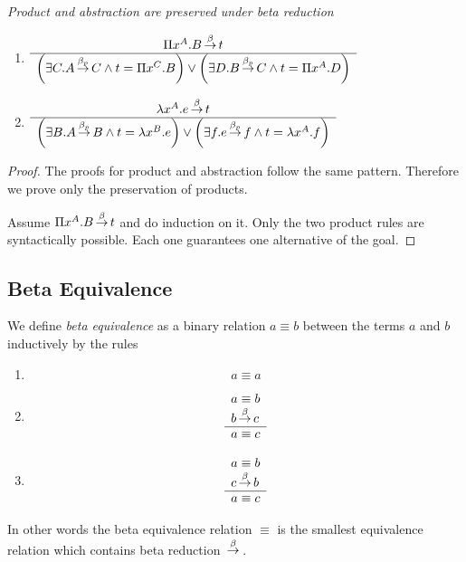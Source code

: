 \begin{lemma}
    \label{ReductionProductAbstraction}
    \emph{Product and abstraction are preserved under beta reduction}
    \begin{enumerate}
    \item
    $
        \begin{array}{c} 
            \Pi x^A.B {\,\stackrel{\beta}{\to}\,} t
         \\ \hline 
            \left( \exists C. A {\,\stackrel{\beta_p}{\to}\,} C \land t = \Pi x^C. B \right)
            \lor
            \left( \exists D. B {\,\stackrel{\beta_p}{\to}\,} C \land t = \Pi x^A. D \right)
        \end{array}
    $
    \item
    $
        \begin{array}{c} 
            \lambda x^A.e {\,\stackrel{\beta}{\to}\,} t
         \\ \hline 
            \left( \exists B. A {\,\stackrel{\beta_p}{\to}\,} B \land t = \lambda x^B. e \right)
            \lor
            \left( \exists f. e {\,\stackrel{\beta_p}{\to}\,} f \land t = \lambda x^A. f \right)
        \end{array}
    $
    \end{enumerate}

    \begin{proof}
        The proofs for product and abstraction follow the same pattern.
        Therefore we prove only the preservation of products.

        Assume $\Pi x^A. B {\,\stackrel{\beta}{\to}\,} t$ and do induction on it. Only the two
        product rules are syntactically possible. Each one guarantees one
        alternative of the goal.
    \end{proof}
\end{lemma}



\subsection{Beta Equivalence}


\begin{definition}
    We define \emph{beta equivalence} as a binary relation $a \equiv b$ between
    the terms $a$ and $b$ inductively by the rules
    \begin{enumerate}
    \item
        $$ a \equiv a$$

    \item
        $$
        \begin{array}{l} 
            a \equiv b
            \\
            b {\,\stackrel{\beta}{\to}\,} c
         \\ \hline 
            a \equiv c
        \end{array}
        $$

    \item
        $$
        \begin{array}{l} 
            a \equiv b
            \\
            c {\,\stackrel{\beta}{\to}\,} b
         \\ \hline 
            a \equiv c
        \end{array}
        $$
    \end{enumerate}

    In other words the beta equivalence relation $\equiv$ is the smallest
    equivalence relation which contains beta reduction ${\,\stackrel{\beta}{\to}\,}$.
\end{definition}


